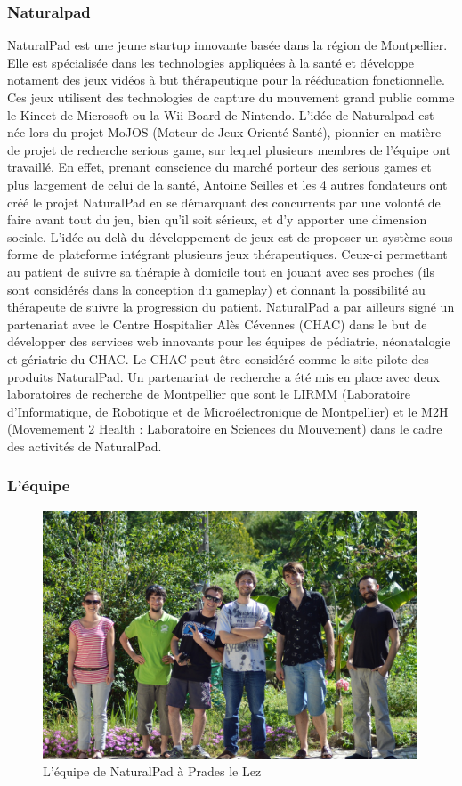 	\subsubsection{Naturalpad}
NaturalPad est une jeune startup innovante basée dans la région de Montpellier. Elle est spécialisée dans les technologies appliquées à la santé et développe notament des jeux vidéos à but thérapeutique pour la rééducation fonctionnelle. Ces jeux utilisent des technologies de capture du mouvement grand public comme le Kinect de Microsoft ou la Wii Board de Nintendo. L’idée de Naturalpad est née lors du projet MoJOS (Moteur de Jeux Orienté Santé), pionnier en matière de projet de recherche serious game, sur lequel plusieurs membres de l’équipe ont travaillé. En effet, prenant conscience du marché porteur des serious games et plus largement de celui de la santé, Antoine Seilles et les 4 autres fondateurs ont créé le projet NaturalPad en se démarquant des concurrents par une volonté de faire avant tout du jeu, bien qu’il soit sérieux, et d’y apporter une dimension sociale. L’idée au delà du développement de jeux est de proposer un système sous forme de plateforme intégrant plusieurs jeux thérapeutiques. Ceux-ci permettant au patient de suivre sa thérapie à domicile tout en jouant avec ses proches (ils sont considérés dans la conception du gameplay) et donnant la possibilité au thérapeute de suivre la progression du patient. NaturalPad a par ailleurs signé un partenariat avec le Centre Hospitalier Alès Cévennes (CHAC) dans le but de développer des services web innovants pour les équipes de pédiatrie, néonatalogie et gériatrie du CHAC. Le CHAC peut être considéré comme le site pilote des produits NaturalPad. Un partenariat de recherche a été mis en place avec deux laboratoires de recherche de Montpellier que sont le LIRMM (Laboratoire d’Informatique, de Robotique et de Microélectronique de Montpellier) et le M2H (Movemement 2 Health : Laboratoire en Sciences du Mouvement) dans le cadre des activités de NaturalPad.

	\subsubsection{L'équipe}
	\begin{figure}[!h]
		\centering
		\includegraphics[width=420px]{images/naturalpad_groupe.jpg}
		\caption{L'équipe de NaturalPad à Prades le Lez}
		\label{naturalpad_groupe}
	\end{figure}
